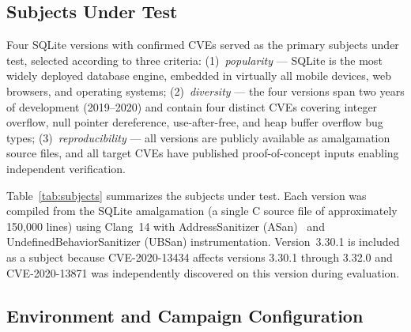 \subsection{Subjects Under Test}
\label{sec:subjects}

Four SQLite versions with confirmed CVEs served as the primary subjects under test, selected according to three criteria: (1)~\emph{popularity} --- SQLite is the most widely deployed database engine, embedded in virtually all mobile devices, web browsers, and operating systems; (2)~\emph{diversity} --- the four versions span two years of development (2019--2020) and contain four distinct CVEs covering integer overflow, null pointer dereference, use-after-free, and heap buffer overflow bug types; (3)~\emph{reproducibility} --- all versions are publicly available as amalgamation source files, and all target CVEs have published proof-of-concept inputs enabling independent verification.

Table~\ref{tab:subjects} summarizes the subjects under test. Each version was compiled from the SQLite amalgamation (a single C source file of approximately 150{,}000 lines) using Clang~14 with AddressSanitizer (ASan)~\citep{asan} and UndefinedBehaviorSanitizer (UBSan) instrumentation. Version~3.30.1 is included as a subject because CVE-2020-13434 affects versions 3.30.1 through 3.32.0 and CVE-2020-13871 was independently discovered on this version during evaluation.

\begin{table}[htbp]
\caption{Subjects under test.}
\label{tab:subjects}
\centering
{}
\end{table}

\subsection{Environment and Campaign Configuration}
\label{sec:environment}

